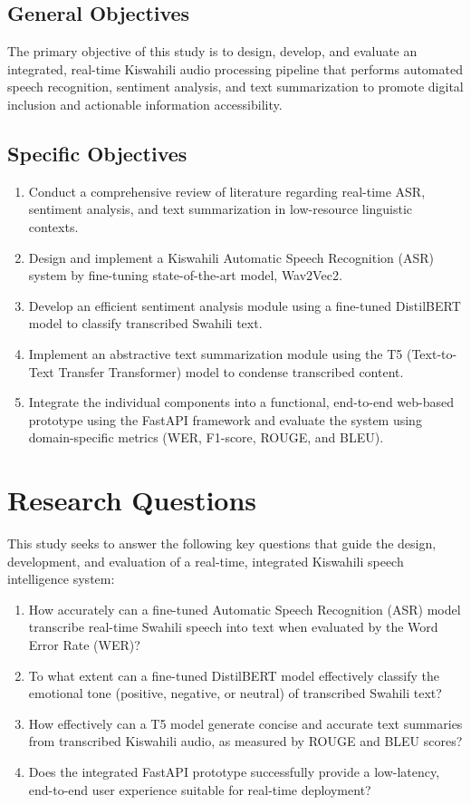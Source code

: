 \subsection{General Objectives}
The primary objective of this study is to design, develop, and evaluate an integrated, real-time Kiswahili audio processing pipeline that performs automated speech recognition, sentiment analysis, and text summarization to promote digital inclusion and actionable information accessibility.
\subsection{Specific Objectives}
\begin{enumerate}
    \item Conduct a comprehensive review of literature regarding real-time ASR, sentiment analysis, and text summarization in low-resource linguistic contexts.
    \item Design and implement a Kiswahili Automatic Speech Recognition (ASR) system by fine-tuning state-of-the-art model, Wav2Vec2.
    \item Develop an efficient sentiment analysis module using a fine-tuned DistilBERT model to classify transcribed Swahili text.
    \item Implement an abstractive text summarization module using the T5 (Text-to-Text Transfer Transformer) model to condense transcribed content.
    \item Integrate the individual components into a functional, end-to-end web-based prototype using the FastAPI framework and evaluate the system using domain-specific metrics (WER, F1-score, ROUGE, and BLEU).
\end{enumerate}

\section{Research Questions}
This study seeks to answer the following key questions that guide the design, development, and evaluation of a real-time, integrated Kiswahili speech intelligence system:
\begin{enumerate}
    \item How accurately can a fine-tuned Automatic Speech Recognition (ASR) model transcribe real-time Swahili speech into text when evaluated by the Word Error Rate (WER)?
    \item To what extent can a fine-tuned DistilBERT model effectively classify the emotional tone (positive, negative, or neutral) of transcribed Swahili text?
    \item How effectively can a T5 model generate concise and accurate text summaries from transcribed Kiswahili audio, as measured by ROUGE and BLEU scores?
    \item Does the integrated FastAPI prototype successfully provide a low-latency, end-to-end user experience suitable for real-time deployment?
\end{enumerate}

